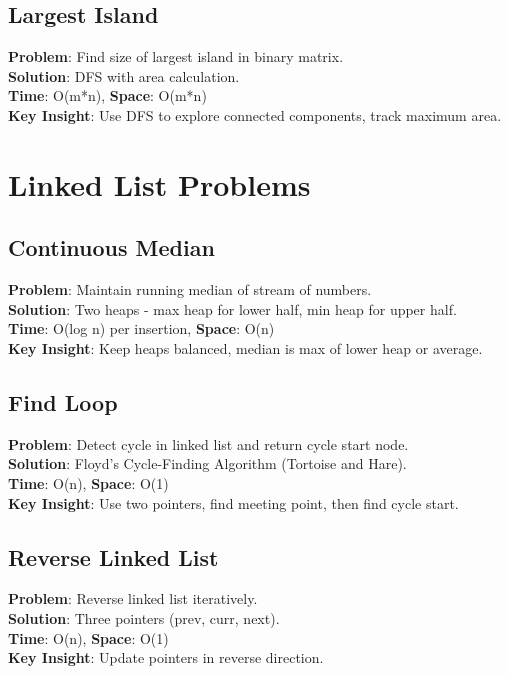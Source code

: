\documentclass{report}
\begin{document}
\subsection{Largest Island}
\textbf{Problem}: Find size of largest island in binary matrix.\\
\textbf{Solution}: DFS with area calculation.\\
\textbf{Time}: O(m*n), \textbf{Space}: O(m*n)\\
\textbf{Key Insight}: Use DFS to explore connected components, track maximum area.

\section{Linked List Problems}

\subsection{Continuous Median}
\textbf{Problem}: Maintain running median of stream of numbers.\\
\textbf{Solution}: Two heaps - max heap for lower half, min heap for upper half.\\
\textbf{Time}: O(log n) per insertion, \textbf{Space}: O(n)\\
\textbf{Key Insight}: Keep heaps balanced, median is max of lower heap or average.

\subsection{Find Loop}
\textbf{Problem}: Detect cycle in linked list and return cycle start node.\\
\textbf{Solution}: Floyd's Cycle-Finding Algorithm (Tortoise and Hare).\\
\textbf{Time}: O(n), \textbf{Space}: O(1)\\
\textbf{Key Insight}: Use two pointers, find meeting point, then find cycle start.

\subsection{Reverse Linked List}
\textbf{Problem}: Reverse linked list iteratively.\\
\textbf{Solution}: Three pointers (prev, curr, next).\\
\textbf{Time}: O(n), \textbf{Space}: O(1)\\
\textbf{Key Insight}: Update pointers in reverse direction.
\end{document}
